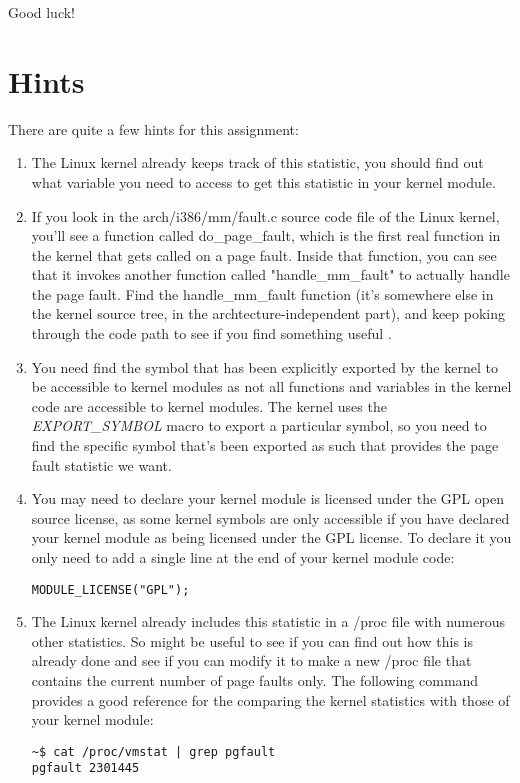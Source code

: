\documentclass[11pt]{article}
\begin{document}
Good luck!

\section*{Hints}

There are quite a few hints for this assignment:

\begin{enumerate}
\item The Linux kernel already keeps track of this statistic, you should find out what variable you need to access to get this statistic in your kernel module.
\item If you look in the arch/i386/mm/fault.c source code file of the Linux kernel, you'll see a function called do\_page\_fault, which is the first real function in the kernel that gets called on a page fault. Inside that function, you can see that it invokes another function called "handle\_mm\_fault" to actually handle the page fault. Find the handle\_mm\_fault function (it's somewhere else in the kernel source tree, in the archtecture-independent part), and keep poking through the code path to see if you find something useful \cite{cse551}.
\item You need find the symbol that has been explicitly exported by the kernel to be accessible to kernel modules as not all functions and variables in the kernel code are accessible to kernel modules. The kernel uses the \emph{EXPORT\_SYMBOL} macro to export a particular symbol, so you need to find the specific symbol that's been exported as such that provides the page fault statistic we want.
\item You may need to declare your kernel module is licensed under the GPL open source license, as some kernel symbols are only accessible if you have declared your kernel module as being licensed under the GPL license. To declare it you only need to add a single line at the end of your kernel module code\cite{gpl}:

\begin{verbatim}
MODULE_LICENSE("GPL");
\end{verbatim}

\item The Linux kernel already includes this statistic in a /proc file with numerous other statistics. So might be useful to see if you can find out how this is already done and see if you can modify it to make a new /proc file that contains the current number of page faults only. The following command provides a good reference for the comparing the kernel statistics with those of your kernel module:

\begin{verbatim}
~$ cat /proc/vmstat | grep pgfault
pgfault 2301445
\end{verbatim}
\end{enumerate}
\end{document}
